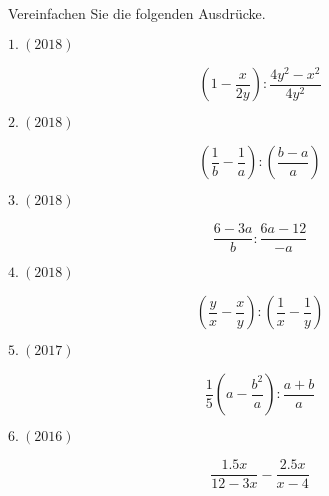




\usepackage{amssymb} %
\renewcommand{\metaHeaderLine}{Arbeitsblatt}
\renewcommand{\arbeitsblattTitel}{Bruchrechnen (alte GESO Maturaaufgaben)}

\arbeitsblattHeader{}
Vereinfachen Sie die folgenden Ausdrücke.

$1.\ (2018)$

$$\left(1-\frac{x}{2y}\right) : \frac{4y^2 - x^2}{4y^2} $$


$2.\ (2018)$

$$\left(\frac{1}{b} - \frac{1}{a}\right) : \left(\frac{b-a}{a}\right)$$

$3.\ (2018)$

$$\frac{6-3a}{b} : \frac{6a-12}{-a}$$
\newpage

$4.\ (2018)$

$$\left(\frac{y}{x} - \frac{x}{y}\right) : \left(\frac{1}{x}
- \frac{1}{y}\right)$$


$5.\ (2017)$

$$\frac{1}{5}\left(a-\frac{b^2}{a}\right) : \frac{a+b}{a}$$

$6.\ (2016)$

$$\frac{1.5x}{12-3x} - \frac{2.5x}{x-4}$$


